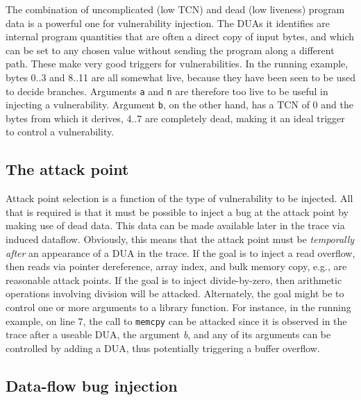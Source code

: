 The combination of uncomplicated (low TCN) and dead (low liveness) program data is a powerful one for vulnerability injection.
The DUAs it identifies are internal program quantities that are often a direct copy of input bytes, and which can be set to any chosen value without sending the program along a different path.  
These make very good triggers for vulnerabilities.
In the running example, bytes 0..3 and 8..11 are all somewhat live, because they have been seen to be used to decide branches.
Arguments \verb+a+ and \verb+n+ are therefore too live to be useful in injecting a vulnerability.
Argument \verb+b+, on the other hand, has a TCN of 0 and the bytes from which it derives, 4..7 are completely dead, 
making it an ideal trigger to control a vulnerability. 

\subsection {The attack point}

Attack point selection is a function of the type of vulnerability to be injected.
All that is required is that it must be possible to inject a bug at the attack point by making use of dead data.
This data can be made available later in the trace via induced dataflow.
Obviously, this means that the attack point must be \emph{temporally after} an appearance of a DUA in the trace.
If the goal is to inject a read overflow, then reads via pointer dereference, array index, and bulk memory copy, e.g., are reasonable attack points.  
If the goal is to inject divide-by-zero, then arithmetic operations involving division will be attacked. 
Alternately, the goal might be to control one or more arguments to a library function.
For instance, in the running example, on line 7, the call to \verb+memcpy+ can be attacked since it is observed in the trace after a useable DUA, the argument \emph{b},
and any of its arguments can be controlled by adding a DUA, thus potentially triggering a buffer overflow. 

\subsection {Data-flow bug injection}

